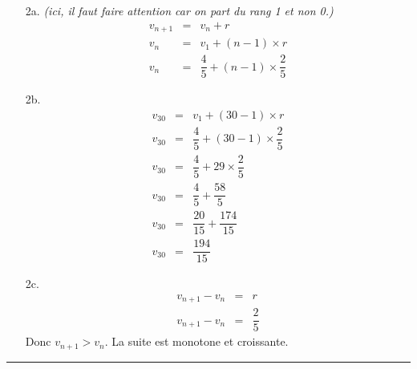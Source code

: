 \documentclass[11pt]{article}
\newcommand{\horrule}[1]{\rule{\linewidth}{#1}} %
\begin{document}
\begin{multicols}{2}
  \begin{enumerate}
  \item[2a.] \textit{ (ici, il faut faire attention car on part du rang 1 et non 0.)}
    \begin{eqnarray*}
      v_{n+1} &=& v_n + r \\
      v_n &=& v_1 + (n-1) \times r \\
      v_n &=& \dfrac{4}{5} + (n-1) \times \dfrac{2}{5}
    \end{eqnarray*}
    
  \item[2b.] 
    \begin{eqnarray*}
      v_{30} &=& v_1 + (30-1) \times r \\
      v_{30} &=& \dfrac{4}{5} + (30-1) \times \dfrac{2}{5}\\
      v_{30} &=& \dfrac{4}{5} + 29 \times \dfrac{2}{5}\\
      v_{30} &=& \dfrac{4}{5} + \dfrac{58}{5}\\
      v_{30} &=& \dfrac{20}{15} + \dfrac{174}{15}\\
      v_{30} &=& \dfrac{194}{15} 
    \end{eqnarray*}
    
  \item[2c.] 
    \begin{eqnarray*}
      v_{n+1} - v_n &=& r \\
      v_{n+1} - v_n &=& \dfrac{2}{5}
    \end{eqnarray*}
    Donc $v_{n+1} > v_n$. La suite est monotone et croissante.
  \end{enumerate}
  
\end{multicols}
\horrule{1px}
\end{document}
